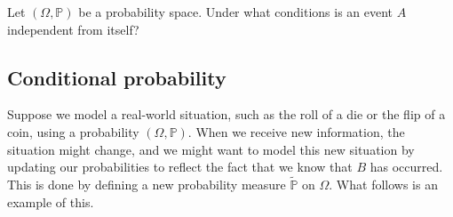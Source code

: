 \begin{exercise}
Let $(\Omega,\mathbb{P})$ be a probability space. Under what conditions is an event $A$ independent from itself?
\end{exercise}

\subsection*{Conditional probability}

Suppose we model a real-world situation, such as the roll of a die or the flip of a coin, using a probability $(\Omega,\mathbb{P})$. When we receive new information, the situation might change, and we might want to model this new situation by updating our probabilities to reflect the fact that we know that $B$ has occurred. This is done by defining a new probability measure $\widetilde{\mathbb{P}}$ on $\Omega$. What follows is an example of this.

